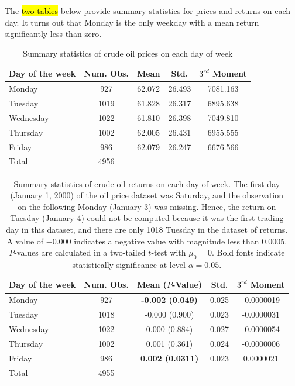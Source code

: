 \documentclass[12pt]{article}
\begin{document}
	\par The \hl{two tables} below provide summary statistics for prices and returns on each day. It turns out that Monday is the only weekday with a mean return significantly less than zero.
	\begin{table}[H]
		\small
		\center
		\begin{tabular}{|l|c c c c|}
			\hline
			Day of the week & Num. Obs. & Mean & Std. & $3^{rd}$ Moment \\
			\hline
			Monday & 927 & 62.072 & 26.493 & 7081.163 \\
			Tuesday & 1019 & 61.828 & 26.317 & 6895.638 \\
			Wednesday & 1022 & 61.810 & 26.398 & 7049.810 \\
			Thursday & 1002 & 62.005 & 26.431 & 6955.555 \\
			Friday & 986 & 62.079 & 26.247 & 6676.566 \\
			\hline
			Total & 4956 & & & \\
			\hline
		\end{tabular}
		\caption{Summary statistics of crude oil prices on each day of week}
	\end{table}

	\begin{table}[H]
		\small
		\center
		\begin{tabular}{|l|c c c c|}
			\hline
			Day of the week & Num. Obs. & Mean ($P$-Value) & Std. & $3^{rd}$ Moment \\
			\hline
			Monday & 927 & \textbf{-0.002 (0.049)} & 0.025 & -0.0000019 \\
			Tuesday & 1018 & -0.000 (0.900) & 0.023 & -0.0000031 \\
			Wednesday & 1022 & 0.000 (0.884) & 0.027 & -0.0000054 \\
			Thursday & 1002 & 0.001 (0.361) & 0.024 & -0.0000006 \\
			Friday & 986 & \textbf{0.002 (0.0311)} & 0.023 & 0.0000021 \\
			\hline
			Total & 4955 & & & \\
			\hline
		\end{tabular}
		\caption{Summary statistics of crude oil returns on each day of week. The first day (January 1, 2000) of the oil price dataset was Saturday, and the observation on the following Monday (January 3) was missing. Hence, the return on Tuesday (January 4) could not be computed because it was the first trading day in this dataset, and there are only 1018 Tuesday in the dataset of returns. A value of $-0.000$ indicates a negative value with magnitude less than $0.0005$. $P$-values are calculated in a two-tailed $t$-test with $\mu_0 = 0$. Bold fonts indicate statistically significance at level $\alpha=0.05$.}
	\end{table}
	
\end{document}
